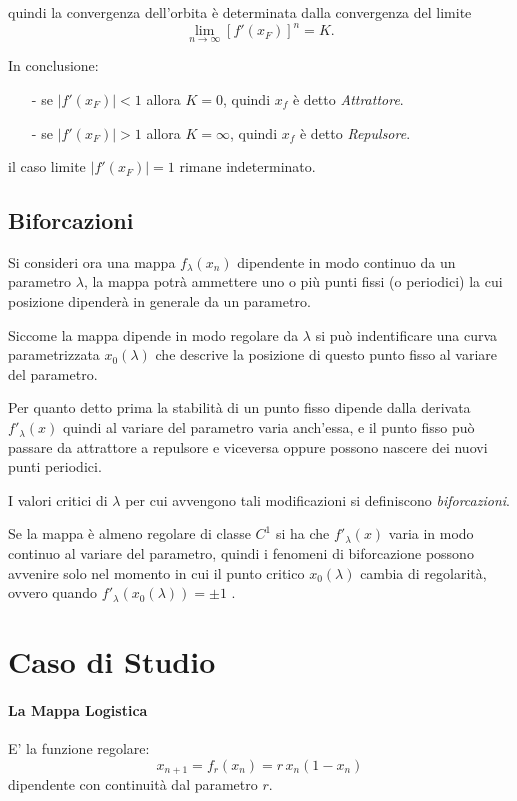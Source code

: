 \documentclass[13pt]{article}
\begin{document}
quindi la convergenza dell'orbita è determinata dalla convergenza del limite $$ \lim_{n\rightarrow\infty}[ f'(x_{F}) ]^{n} = K.$$

In conclusione:
	\begin{itemize}
	\item[-] se $\vert f'(x_{F}) \vert < 1$ allora $K=0$, quindi $x_{f}$ è detto \emph{Attrattore}.
	\item[-] se $\vert f'(x_{F}) \vert > 1$ allora $K=\infty$, quindi $x_{f}$ è detto \emph{Repulsore}.
	\end{itemize}
il caso limite $\vert f'(x_{F}) \vert = 1$ rimane indeterminato.


\subsection{Biforcazioni}
Si consideri ora una mappa $f_{\lambda}(x_{n})$ dipendente in modo continuo da un parametro $\lambda$, la mappa potrà ammettere uno o più punti fissi (o periodici) la cui posizione dipenderà in generale da un parametro.

Siccome la mappa dipende in modo regolare da $\lambda$ si può indentificare una curva parametrizzata $x_{0}(\lambda)$ che descrive la posizione di questo punto fisso al variare del parametro.

Per quanto detto prima la stabilità di un punto fisso dipende dalla derivata $f'_{\lambda}(x) $ quindi al variare del parametro varia anch'essa, e il punto fisso può passare da attrattore a repulsore e viceversa oppure possono nascere dei nuovi punti periodici.

I valori critici di $\lambda$ per cui avvengono tali modificazioni si definiscono \emph{biforcazioni}.

Se la mappa è almeno regolare di classe $C^{1}$ si ha che $f'_{\lambda}(x) $ varia in modo continuo al variare del parametro, quindi i fenomeni di biforcazione possono avvenire solo nel momento in cui il punto critico $x_{0}(\lambda)$ cambia di regolarità, ovvero quando $f'_{\lambda}(x_{0}(\lambda)) = \pm 1$ .


 
\section{Caso di Studio}

\paragraph{La Mappa Logistica}
E' la funzione regolare:
	\begin{equation}
		x_{n+1} = f_{r}(x_{n}) = r \, x_{n}(1-x_{n})
	\end{equation}
dipendente con continuità dal parametro $r$.
\end{document}
